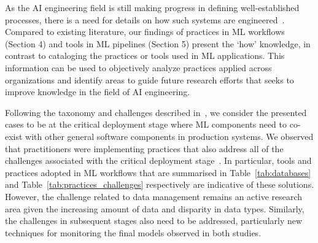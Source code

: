




As the AI engineering field is still making progress in defining well-established processes, there is a need for details on how such systems are engineered~\cite{9121629}. Compared to existing literature, our findings of practices in ML workflows (Section 4) and tools in ML pipelines (Section 5) present the ‘how’ knowledge, in contrast to cataloging the practices or tools used in ML applications. This information can be used to objectively analyze practices applied across organizations and identify areas to guide future research efforts that seeks to improve knowledge in the field of AI engineering.

Following the taxonomy and challenges described in~\cite{Lwakatare2019}, we consider the presented cases to be at the critical deployment stage where ML components need to co-exist with other general software components in production systems. We observed that practitioners were implementing practices that also address all of the challenges associated with the critical deployment stage~\cite{Lwakatare2019}. In particular, tools and practices adopted in ML workflows that are summarised in Table~\ref{tab:databases} and Table~\ref{tab:practices_challenges} respectively are indicative of these solutions. However, the challenge related to data management remains an active research area given the increasing amount of data and disparity in data types. Similarly, the challenges in subsequent stages also need to be addressed, particularly new techniques for monitoring the final models observed in both studies.

